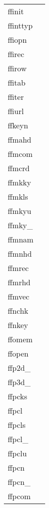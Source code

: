 \documentclass[11pt]{book}
\begin{document}
\begin{tabular}{lr}

ffinit  & \pageref{ffinit} \\
ffinttyp    & \pageref{ffinttyp} \\
ffiopn & \pageref{ffopen} \\
ffirec     & \pageref{ffirec} \\
ffirow  & \pageref{ffirow} \\
ffitab    & \pageref{ffitab} \\
ffiter   & \pageref{ffiter} \\
ffiurl & \pageref{ffiurl} \\
ffkeyn      & \pageref{ffkeyn} \\
ffmahd     & \pageref{ffmahd} \\
ffmcom    & \pageref{ffmcom} \\
ffmcrd       & \pageref{ffmcrd} \\
ffmkky    & \pageref{ffmkky} \\
ffmkls    & \pageref{ffmkyx} \\
ffmkyu   & \pageref{ffmkyu} \\
ffmky\_    & \pageref{ffmkyx} \\
ffmnam       & \pageref{ffmnam} \\
ffmnhd     & \pageref{ffmnhd} \\
ffmrec     & \pageref{ffmrec} \\
ffmrhd     & \pageref{ffmrhd} \\
ffmvec  & \pageref{ffmvec} \\
ffnchk  & \pageref{ffnchk} \\
ffnkey      & \pageref{ffnkey} \\
ffomem   & \pageref{ffomem} \\
ffopen      & \pageref{ffopen} \\
ffp2d\_   & \pageref{ffp2dx} \\
ffp3d\_   & \pageref{ffp3dx} \\
ffpcks   & \pageref{ffpcks} \\
ffpcl         & \pageref{ffpcl} \\
ffpcls     & \pageref{ffpcls} \\
ffpcl\_     & \pageref{ffpclx} \\
ffpclu      & \pageref{ffpclu} \\
ffpcn    & \pageref{ffpcn} \\
ffpcn\_ & \pageref{ffpcnx} \\
ffpcom      & \pageref{ffpcom} \\

\end{tabular}
\end{document}
